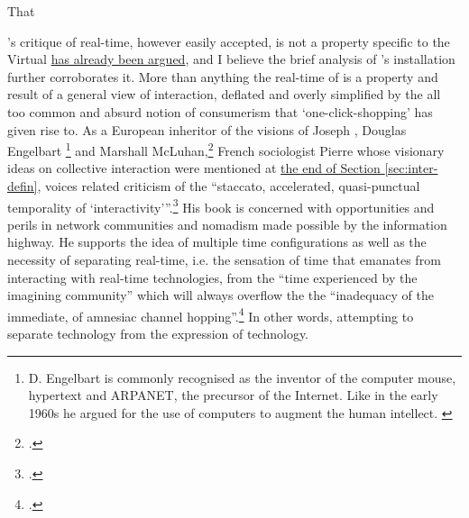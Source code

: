 \hypertarget{sec:target:time-inter-revis}{That} \citeauthor{baudrillard02}'s critique of real-time, however easily accepted, is not a property specific to the Virtual \hyperlink{par:human-comp-inter:10}{has already been argued}, and I believe the brief analysis of \citeauthor{rokeby91}'s installation further corroborates it. More than anything the real-time of \citeauthor{baudrillard02} is a property and result of a general view of interaction, deflated and overly simplified by the all too common  and absurd notion of consumerism that `one-click-shopping' has given rise to. As a European inheritor of the visions of Joseph \citeauthor{licklider60}, Douglas Engelbart \footnote{D. Engelbart is commonly recognised as the inventor of the computer mouse, hypertext and ARPANET, the precursor of the Internet. Like \citeauthor{licklider60} in the early 1960s he argued for the use of computers to augment the human intellect. \parencites()()[See][viii]{levy97}[See also][]{johnson97}} and Marshall McLuhan,\footcite[See the foreword to][by R. Bononno]{levy97} French sociologist Pierre \citeauthor{levy97} whose visionary ideas on collective interaction were mentioned at \hyperlink{sec:target:inter-defin:par6}{the end of Section \ref*{sec:inter-defin}}, voices related criticism of the ``staccato, accelerated, quasi-punctual temporality of `interactivity'''.\footcite[125]{levy97} His book  is concerned with opportunities and perils in network communities and nomadism made possible by the information highway. He supports the idea of multiple time configurations as well as the necessity of separating real-time, i.e. the sensation of time that emanates from interacting with real-time technologies, from the ``time experienced by the imagining community'' which will always overflow the the ``inadequacy of the immediate, of amnesiac channel hopping''.\footcite[125]{levy97} In other words, attempting to separate technology from the expression of technology.

